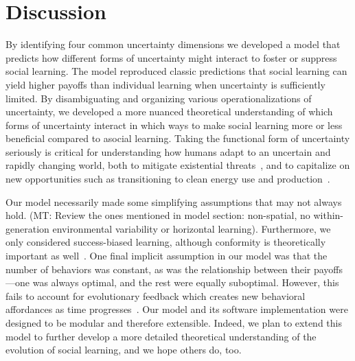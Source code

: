 \documentclass[letterpaper,11.5pt]{scrartcl}
\newcommand{\mt}[1]{{\textcolor{myorange} {({\tiny MT:} #1)}}}
\begin{document}
\section{Discussion}

By identifying four common uncertainty dimensions we developed a model that
predicts how different forms of uncertainty might interact to foster or suppress
social learning.  The model reproduced classic predictions that social learning can
yield higher payoffs than individual learning when uncertainty is sufficiently
limited.  By disambiguating and organizing various operationalizations of
uncertainty, we developed a more nuanced theoretical understanding of which forms
of uncertainty interact in which ways to make social learning more or less
beneficial compared to asocial learning. Taking the functional form of uncertainty
seriously is critical for understanding how humans adapt to an uncertain and
rapidly changing world, both to mitigate existential
threats~\cite{Moya2020,Jones2021}, and to capitalize on new opportunities such as
transitioning to clean energy use and
production~\cite{NatureEnergyEditorialPromisesPremises2018,Brisbois2022}.

Our model necessarily made some simplifying assumptions that may not always hold.
\mt{Review the ones mentioned in model section: non-spatial, no within-generation
environmental variability or horizontal learning}.
Furthermore, we only considered
success-biased learning, although conformity is theoretically important as
well~\cite{Muthukrishna2016a,Smaldino2018b}. One final implicit assumption
in our model was that the number of behaviors was constant, as was the relationship
between their payoffs---one was always optimal, and the rest were equally
suboptimal. However, this fails to account for evolutionary feedback which creates
new behavioral affordances as time progresses~\cite{Smaldino2012,Heras-Escribano2020}.
Our model and its software implementation were designed to be modular and 
therefore extensible.  Indeed, we plan to extend this model to further develop 
a more detailed theoretical understanding of the evolution of social learning, 
and we hope others do, too.
\end{document}
